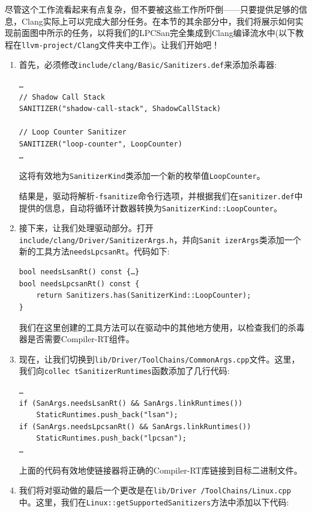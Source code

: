 尽管这个工作流看起来有点复杂，但不要被这些工作所吓倒——只要提供足够的信息，Clang实际上可以完成大部分任务。在本节的其余部分中，我们将展示如何实现前面图中所示的任务，以将我们的LPCSan完全集成到Clang编译流水中(以下教程在\texttt{llvm-project/Clang}文件夹中工作)。让我们开始吧！

\begin{enumerate}
\item 首先，必须修改\texttt{include/clang/Basic/Sanitizers.def}来添加杀毒器:

\begin{lstlisting}[style=styleCXX]
…
// Shadow Call Stack
SANITIZER("shadow-call-stack", ShadowCallStack)

// Loop Counter Sanitizer
SANITIZER("loop-counter", LoopCounter)
…
\end{lstlisting}

这将有效地为\texttt{SanitizerKind}类添加一个新的枚举值\texttt{LoopCounter}。

结果是，驱动将解析\texttt{-fsanitize}命令行选项，并根据我们在\texttt{sanitizer.def}中提供的信息，自动将循环计数器转换为\texttt{SanitizerKind::LoopCounter}。

\item 接下来，让我们处理驱动部分。打开\texttt{include/clang/Driver/SanitizerArgs.h}，并向\texttt{Sanit izerArgs}类添加一个新的工具方法\texttt{needsLpcsanRt}。代码如下:

\begin{lstlisting}[style=styleCXX]
bool needsLsanRt() const {…}
bool needsLpcsanRt() const {
	return Sanitizers.has(SanitizerKind::LoopCounter);
}
\end{lstlisting}

我们在这里创建的工具方法可以在驱动中的其他地方使用，以检查我们的杀毒器是否需要Compiler-RT组件。

\item 现在，让我们切换到\texttt{lib/Driver/ToolChains/CommonArgs.cpp}文件。这里，我们向\texttt{collec tSanitizerRuntimes}函数添加了几行代码:

\begin{lstlisting}[style=styleCXX]
…
if (SanArgs.needsLsanRt() && SanArgs.linkRuntimes())
	StaticRuntimes.push_back("lsan");
if (SanArgs.needsLpcsanRt() && SanArgs.linkRuntimes())
	StaticRuntimes.push_back("lpcsan");
…
\end{lstlisting}

上面的代码有效地使链接器将正确的Compiler-RT库链接到目标二进制文件。

\item 我们将对驱动做的最后一个更改是在\texttt{lib/Driver /ToolChains/Linux.cpp}中。这里，我们在\texttt{Linux::getSupportedSanitizers}方法中添加以下代码:


\end{enumerate}

